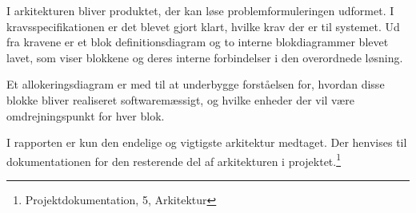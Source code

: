 
I arkitekturen bliver produktet, der kan løse problemformuleringen udformet. I kravsspecifikationen er det blevet gjort klart, hvilke krav der er til systemet. Ud fra kravene er et blok definitionsdiagram og to interne blokdiagrammer blevet lavet, som viser blokkene og deres interne forbindelser i den overordnede løsning.

Et allokeringsdiagram er med til at underbygge forståelsen for, hvordan disse blokke bliver realiseret softwaremæssigt, og hvilke enheder der vil være omdrejningspunkt for hver blok.

I rapporten er kun den endelige og vigtigste arkitektur medtaget. Der henvises til dokumentationen for den resterende del af arkitekturen i projektet.\footnote{Projektdokumentation, 5, Arkitektur}